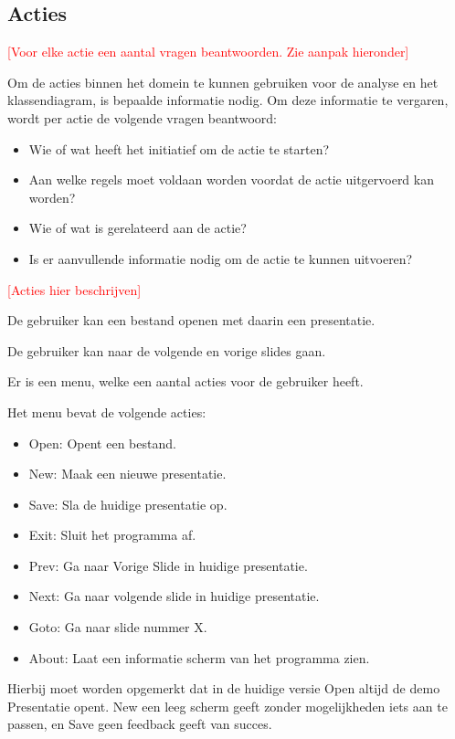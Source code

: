 \documentclass[a4paper]{article}
\newcommand{\todo}[1]{\textcolor{red}{[#1]}}
\begin{document}
\subsection{Acties}
\todo{Voor elke actie een aantal vragen beantwoorden. Zie aanpak hieronder}

Om de acties binnen het domein te kunnen gebruiken voor de analyse en het klassendiagram, is bepaalde informatie nodig. Om deze informatie te vergaren, wordt per actie de volgende vragen beantwoord:

\begin{itemize}[noitemsep]
\item Wie of wat heeft het initiatief om de actie te starten?
\item Aan welke regels moet voldaan worden voordat de actie uitgervoerd kan worden?
\item Wie of wat is gerelateerd aan de actie?
\item Is er aanvullende informatie nodig om de actie te kunnen uitvoeren?
\end{itemize}

\todo{Acties hier beschrijven}

De gebruiker kan een bestand openen met daarin een presentatie.

De gebruiker kan naar de volgende en vorige slides gaan.

Er is een menu, welke een aantal acties voor de gebruiker heeft.

Het menu bevat de volgende acties:
\begin{itemize}
    \item Open: Opent een bestand.
    \item New: Maak een nieuwe presentatie.
    \item Save: Sla de huidige presentatie op.
    \item Exit: Sluit het programma af.
    \item Prev: Ga naar Vorige Slide in huidige presentatie.
    \item Next: Ga naar volgende slide in huidige presentatie.
    \item Goto: Ga naar slide nummer X.
    \item About: Laat een informatie scherm van het programma zien.
\end{itemize}
Hierbij moet worden opgemerkt dat in de huidige versie Open altijd de demo
Presentatie opent. New een leeg scherm geeft zonder mogelijkheden iets aan te
passen, en Save geen feedback geeft van succes.
\end{document}

